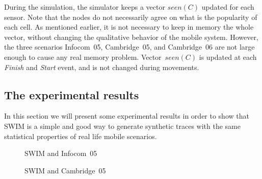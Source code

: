 \documentclass[conference]{IEEEtran}
\begin{document}
During the simulation, the simulator keeps a vector $\textit{seen}(C)$ updated
for each sensor. Note that the nodes do not necessarily agree on what is the
popularity of each cell. As mentioned earlier, it is not necessary to keep in
memory the whole vector, without changing the qualitative behavior of the mobile
system. However, the three scenarios Infocom~05, Cambridge~05, and Cambridge~06
are not large enough to cause any real memory problem. Vector~$\textit{seen}(C)$
is updated at each \emph{Finish} and \emph{Start} event, and is not changed
during movements.

\subsection{The experimental results}

In this section we will present some experimental results in order to show that
SWIM is a simple and good way to generate synthetic traces with the same
statistical properties of real life mobile scenarios.
\begin{figure}[!ht]
\centering
{}
\qquad
{}
\qquad
{}
\caption{SWIM and Infocom~05}
\label{fig:infocom}
\end{figure}
\begin{figure}[t]
\centering
{}
\qquad
{}
\qquad
{}
\caption{SWIM and Cambridge~05}
\label{fig:cambridge05}
\end{figure}
\end{document}
